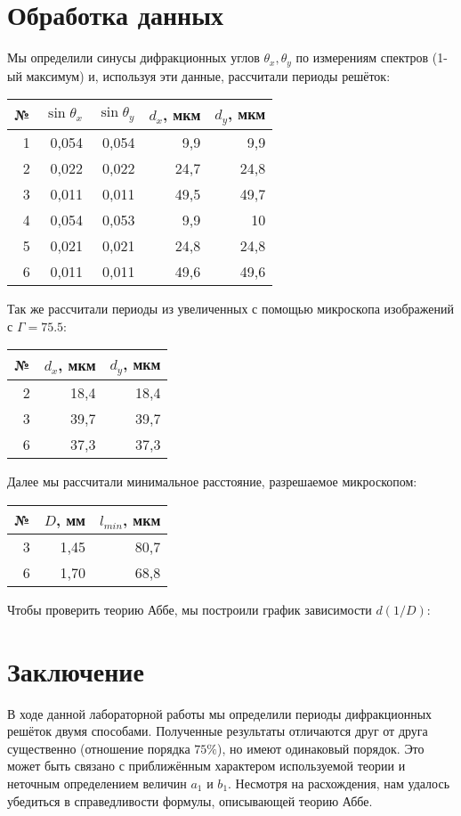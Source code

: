 \section*{Обработка данных}
Мы определили синусы дифракционных углов $\theta_x, \theta_y$ по измерениям спектров (1-ый максимум) и, используя эти данные, рассчитали периоды решёток:
\begin{table}[H]
\centering
\begin{tabular}{|r||r|r||r|r|}
\hline
№ & $\sin \theta_x$     & $\sin \theta_y$ & $d_x$, мкм & $d_y$, мкм    \\ \hline \hline
1 & 0,054  & 0,054 & 9,9 & 9,9 \\ \hline
2 & 0,022  & 0,022 & 24,7 & 24,8\\ \hline
3 & 0,011 & 0,011 & 49,5 & 49,7\\ \hline
4 & 0,054 & 0,053 & 9,9 & 10\\ \hline
5 & 0,021  & 0,021 & 24,8 & 24,8\\ \hline
6 & 0,011 & 0,011 & 49,6 & 49,6\\ \hline
\end{tabular}
\end{table}
\n
Так же рассчитали периоды из увеличенных с помощью микроскопа изображений с $\Gamma = 75.5$:
\begin{table}[H]
\centering
\begin{tabular}{|r||r|r|}
\hline
№ & $d_x$, мкм & $d_y$, мкм \\ \hline \hline
2 & 18,4 & 18,4 \\ \hline
3 & 39,7 & 39,7 \\ \hline
6 & 37,3 & 37,3 \\ \hline
\end{tabular}
\end{table}
\n
Далее мы рассчитали минимальное расстояние, разрешаемое микроскопом:
\begin{table}[H]
\centering
\begin{tabular}{|r|r|r|}
\hline
№ & $D$, мм & $l_{min}$, мкм \\ \hline \hline
3 & 1,45 & 80,7 \\ \hline
6 & 1,70 & 68,8 \\ \hline
\end{tabular}
\end{table}
\n
Чтобы проверить теорию Аббе, мы построили график зависимости $d(1/D)$:
\section*{Заключение}
В ходе данной лабораторной работы мы определили периоды дифракционных решёток двумя способами. Полученные результаты отличаются друг от друга существенно (отношение порядка $75 \%$), но имеют одинаковый порядок. Это может быть связано с приближённым характером используемой теории и неточным определением величин $a_1$ и $b_1$.
Несмотря на расхождения, нам удалось убедиться в справедливости формулы, описывающей теорию Аббе. 

